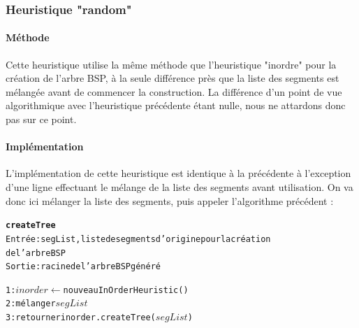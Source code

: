\documentclass[11pt,a4paper]{article}
\begin{document}
\subsubsection{Heuristique "random"}

\paragraph{Méthode}

Cette heuristique utilise la même méthode que l'heuristique "inordre" pour la création de l'arbre BSP, à la seule différence près que la liste des segments est mélangée avant de commencer la construction. La différence d'un point de vue algorithmique avec l'heuristique précédente étant nulle, nous ne attardons donc pas sur ce point. 

\paragraph{Implémentation}

L'implémentation de cette heuristique est identique à la précédente à l'exception d'une ligne effectuant le mélange de la liste des segments avant utilisation. On va donc ici mélanger la liste des segments, puis appeler l'algorithme précédent :

\begin{alltt}
\textbf{createTree}
Entrée : segList, liste de segments d'origine pour la création 
de l'arbre BSP
Sortie : racine de l'arbre BSP généré

1: \(inorder \leftarrow\) nouveau InOrderHeuristic()
2: mélanger \(segList\)
3: retourner inorder.createTree(\(segList\))
\end{alltt}
\end{document}

